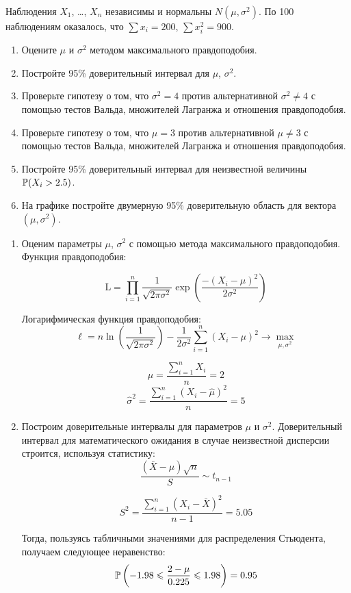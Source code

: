 \begin{problem}
Наблюдения $X_1$, \ldots, $X_n$ независимы и нормальны $N(\mu,\sigma^2)$. По 100 наблюдениям оказалось, что $\sum x_i=200$, $\sum x_i^2=900$.
\begin{enumerate}
\item Оцените $\mu$ и $\sigma^2$ методом максимального правдоподобия.
\item Постройте 95\% доверительный интервал для $\mu$, $\sigma^2$.
\item \useR Проверьте гипотезу о том, что $\sigma^2=4$ против альтернативной $\sigma^2\neq 4$ с помощью тестов Вальда, множителей Лагранжа и отношения правдоподобия.
\item \useR Проверьте гипотезу о том, что $\mu=3$ против альтернативной $\mu\neq 3$ с помощью тестов Вальда, множителей Лагранжа и отношения правдоподобия.
\item \useR Постройте 95\% доверительный интервал для неизвестной величины $\P(X_i>2.5)$.
\item \useR На графике постройте двумерную 95\% доверительную область для вектора $(\mu,\sigma^2)$.
\end{enumerate}


\begin{sol}
\begin{enumerate}
\item Оценим параметры $\mu$, $\sigma^2$ с помощью метода максимального правдоподобия. Функция правдоподобия:

\[\text{L} = \prod_{i=1}^{n} \frac{1}{\sqrt{2\pi\sigma^2}}\exp\left( \frac{- \left( X_i-\mu\right)^2}{2\sigma^2}\right)\]

Логарифмическая функция правдоподобия:
\[\ell = n \ln\left(\frac{1}{\sqrt{2\pi\sigma^2}}\right) - \frac{1}{2\sigma^2}\sum_{i=1}^{n}\left(X_i-\mu\right)^2 \to \max_{\mu,\sigma^2}\]

\[\hat{\mu} = \frac{\sum_{i=1}^{n}X_i}{n} = 2\]
\[\hat{\sigma}^2 = \frac{\sum_{i=1}^{n}\left(X_i-\hat{\mu}\right)^2}{n} = 5\]

\item Построим доверительные интервалы для параметров $\mu$ и $\sigma^2$. Доверительный интервал для математического ожидания в случае неизвестной дисперсии строится, используя статистику:
\[\frac{\left(\bar{X} - \mu\right)\sqrt{n}}{S} \sim t_{n-1}\]

\[S^2 = \frac{\sum_{i=1}^{n}\left( X_i - \bar{X}\right)^2 }{n-1} = 5.05\]

Тогда, пользуясь табличными значениями для распределения Стьюдента, получаем следующее неравенство:
\[\P\left( -1.98 \leqslant \frac{2-\mu}{0.225} \leqslant 1.98 \right) = 0.95 \]


\end{enumerate}
\end{sol}
\end{problem}
